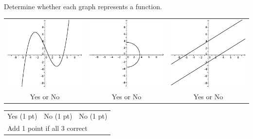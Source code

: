 {
	Determine whether each graph represents a function.
	\begin{center}
	\begin{tabular}{ccc}
	\includegraphics[scale=1]{fig100-22-c-iii.pdf} & \includegraphics[scale=1]{fig100-22-d-ii.pdf} & \includegraphics[scale=1]{fig100-22-d-iii.pdf}\\
	Yes or No & Yes or No & Yes or No
	\end{tabular}
	\end{center}
}
{
	\begin{tabular}{lll}
	Yes (1 pt) & No (1 pt) & No (1 pt)\\
	\multicolumn{3}{l}{Add 1 point if all 3 correct}
	\end{tabular}
}
